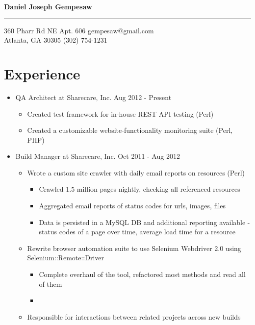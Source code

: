 \documentclass[10pt]{article}
\newenvironment{myitem}{
  \begin{itemize}
    \setlength{\itemsep}{1pt}
    \setlength{\parskip}{0pt}
    \setlength{\parsep}{0pt}
}{\end{itemize}}
\begin{document}
\begin{center}
  \Large
  \textbf{Daniel Joseph Gempesaw}
\end{center}
\hrule
\vspace{0.2 cm}
\normalsize
360 Pharr Rd NE Apt. 606 \hfill gempesaw@gmail.com\\
Atlanta, GA 30305 \hfill (302) 754-1231\\
\vspace{-.60 cm}

\section{Experience}

\begin{myitem}
\item QA Architect at Sharecare, Inc. \hfill Aug 2012 - Present
  \begin{myitem}
  \item Created test framework for in-house REST API testing (Perl)
  \item Created a customizable website-functionality monitoring suite (Perl, PHP)
  \end{myitem}

\item Build Manager at Sharecare, Inc. \hfill Oct 2011 - Aug 2012
  \begin{myitem}
  \item Wrote a custom site crawler with daily email reports on resources (Perl)
    \begin{myitem}
    \item Crawled 1.5 million pages nightly, checking all referenced resources
    \item Aggregated email reports of status codes for urls, images, files
    \item Data is persisted in a MySQL DB and additional reporting available - status codes of a page over time, average load time for a resource
    \end{myitem}
  \item Rewrite browser automation suite to use Selenium Webdriver 2.0 using Selenium::Remote::Driver
    \begin{myitem}
    \item Complete overhaul of the tool, refactored most methods and read all of them
    \item
    \end{myitem}
  \item Responsible for interactions between related projects across new builds
  \end{myitem}


\end{myitem}
\end{document}

